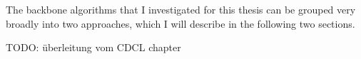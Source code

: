 The backbone algorithms that I investigated for this thesis can be grouped very broadly into two approaches, which I will describe in the following two sections.

TODO: überleitung vom CDCL chapter
